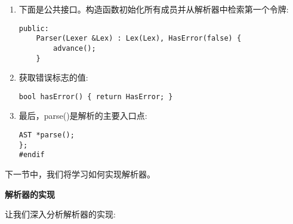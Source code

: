 \begin{enumerate}
\item 下面是公共接口。构造函数初始化所有成员并从解析器中检索第一个令牌:
\begin{lstlisting}[caption={}]
	public:
	Parser(Lexer &Lex) : Lex(Lex), HasError(false) {
		advance();
	}
\end{lstlisting}

\item 获取错误标志的值:
\begin{lstlisting}[caption={}]
	bool hasError() { return HasError; }
\end{lstlisting}

\item 最后，parse()是解析的主要入口点:
\begin{lstlisting}[caption={}]
	AST *parse();
};
#endif
\end{lstlisting}
	
\end{enumerate}

下一节中，我们将学习如何实现解析器。\par

\hspace*{\fill} \par %
\textbf{解析器的实现}

让我们深入分析解析器的实现:\par

